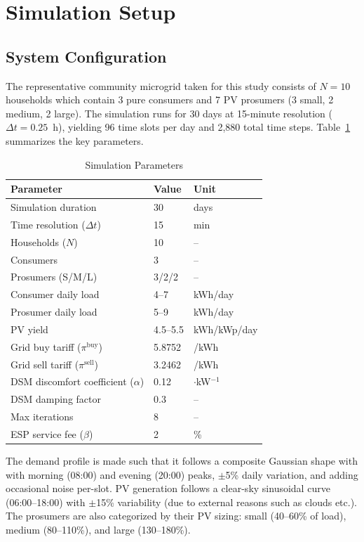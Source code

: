 \documentclass[conference]{IEEEtran}
\newcommand{\rupee}{\text{Rs.}}
\begin{document}
\section{Simulation Setup}

\subsection{System Configuration}

The representative community microgrid taken for this study consists of $N = 10$ households which contain 3 pure consumers and 7 PV prosumers (3 small, 2 medium, 2 large). The simulation runs for 30 days at 15-minute resolution ($\Delta t = 0.25$~h), yielding 96 time slots per day and 2,880 total time steps. Table~\ref{tab:params} summarizes the key parameters.

\begin{table}[t]
\caption{Simulation Parameters}
\label{tab:params}
\centering
\begin{tabular}{lll}
\toprule
\textbf{Parameter} & \textbf{Value} & \textbf{Unit} \\
\midrule
Simulation duration & 30 & days \\
Time resolution ($\Delta t$) & 15 & min \\
Households ($N$) & 10 & -- \\
\quad Consumers & 3 & -- \\
\quad Prosumers (S/M/L) & 3/2/2 & -- \\
Consumer daily load & 4--7 & kWh/day \\
Prosumer daily load & 5--9 & kWh/day \\
PV yield & 4.5--5.5 & kWh/kWp/day \\
Grid buy tariff ($\pi^{\text{buy}}$) & 5.8752 & \rupee/kWh \\
Grid sell tariff ($\pi^{\text{sell}}$) & 3.2462 & \rupee/kWh \\
DSM discomfort coefficient ($\alpha$) & 0.12 & \rupee$\cdot$kW$^{-1}$ \\
DSM damping factor & 0.3 & -- \\
Max iterations & 8 & -- \\
ESP service fee ($\beta$) & 2 & \% \\
\bottomrule
\end{tabular}
\end{table}

The demand profile is made such that it follows a composite Gaussian shape with with morning (08:00) and evening (20:00) peaks, $\pm$5\% daily variation, and adding occasional noise per-slot. PV generation follows a clear-sky sinusoidal curve (06:00--18:00) with $\pm$15\% variability (due to external reasons such as clouds etc.). The prosumers are also categorized by their PV sizing: small (40--60\% of load), medium (80--110\%), and large (130--180\%).
\end{document}
